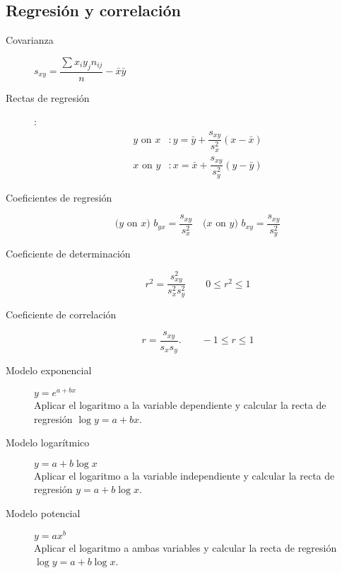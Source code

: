 \begin{multicols*}{2}
	\subsection*{Regresión y correlación}

	\begin{tcolorbox}[hbox, title=Regresión lineal]
		\begin{minipage}{0.4\textwidth}
			\begin{description}
				\item [Covarianza] $s_{xy}=\dfrac{\sum x_iy_jn_{ij}}{n}-\bar{x}\bar{y}$
				\item [Rectas de regresión]:
				      \begin{align*}
					      \mbox{$y$ on $x$} & : y=\bar{y}+\dfrac{s_{xy}}{s_x^2}(x-\bar{x}) \\
					      \mbox{$x$ on $y$} & : x=\bar{x}+\dfrac{s_{xy}}{s_y^2}(y-\bar{y})
				      \end{align*}
				\item [Coeficientes de regresión]
				      \[
					      \mbox{($y$ on $x$) } b_{yx}=\dfrac{s_{xy}}{s_x^2}\quad \mbox{($x$ on
						      $y$) } b_{xy}=\dfrac{s_{xy}}{s_y^2}
				      \]
				\item[Coeficiente de determinación]
				      \[r^2=\dfrac{s_{xy}^2}{s_x^2s_y^2} \qquad 0\leq r^2\leq 1\]
				\item[Coeficiente de correlación]
				      \[r=\dfrac{s_{xy}}{s_xs_y}.\qquad -1\leq r\leq 1\]
			\end{description}
		\end{minipage}
	\end{tcolorbox}

	\medskip

	\begin{tcolorbox}[hbox, title=Regresión no lineal]
		\begin{minipage}{0.4\textwidth}
			\begin{description}
				\item[Modelo exponencial] $y=e^{a+bx}$\\
				      Aplicar el logaritmo a la variable dependiente y calcular la recta de regresión $\log y = a+bx$.
				\item[Modelo logarítmico] $y=a+b\log x$\\
				      Aplicar el logaritmo a la variable independiente y calcular la recta de regresión $y=a+b\log x$.
				\item[Modelo potencial] $y=ax^b$\\
				      Aplicar el logaritmo a ambas variables y calcular la recta de regresión $\log y = a+b\log x$.
			\end{description}
		\end{minipage}
	\end{tcolorbox}


\end{multicols*}
